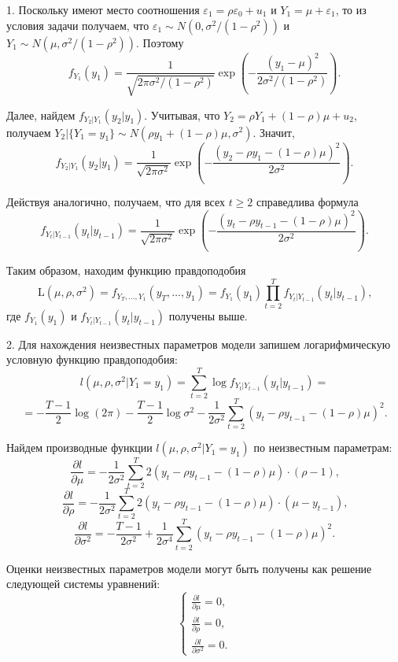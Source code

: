 \documentclass[pdftex,11pt,openany]{book}\usepackage[]{graphicx}\usepackage[]{color}
\begin{document}
\begin{solution}
1. Поскольку имеют место соотношения $\varepsilon_1 = \rho \varepsilon_0 + u_1$ и $Y_1 =\mu + \varepsilon_1$, то из условия задачи получаем, что $\varepsilon_1 \sim N(0,\sigma^2 / (1 - \rho^2))$
и $Y_1 \sim N(\mu,\sigma^2 / (1 - \rho^2))$. Поэтому
\[
f_{Y_1}(y_1) = \frac{1}{\sqrt{2\pi\sigma^2/(1-\rho^2)}}\exp{\left(-\frac{(y_1 - \mu)^2}{2\sigma^2/(1 - \rho^2)}\right)}.
\]

Далее, найдем $f_{Y_2|Y_1}(y_2|y_1)$. Учитывая, что $Y_2 = \rho Y_1 + (1- \rho) \mu + u_2$, получаем $Y_2|\{Y_1 = y_1\} \sim N(\rho y_1 + (1- \rho) \mu, \sigma^2)$. Значит,
\[
f_{Y_2|Y_1}(y_2|y_1) = \frac{1}{\sqrt{2\pi\sigma^2}}\exp{\left(-\frac{(y_2 - \rho y_1 - (1- \rho) \mu)^2}{2\sigma^2}\right)}.
\]

Действуя аналогично, получаем, что для всех $t \geq 2$ справедлива формула
\[
f_{Y_{t}|Y_{t-1}}(y_{t}|y_{t-1}) = \frac{1}{\sqrt{2\pi\sigma^2}}\exp{\left(-\frac{(y_{t} - \rho y_{t-1} - (1- \rho) \mu)^2}{2\sigma^2}\right)}.
\]

Таким образом, находим функцию правдоподобия
\[
\mathrm{L}(\mu, \rho, \sigma^2) = f_{Y_T,\ldots,Y_1}(y_T,\dots,y_1) = f_{Y_1}(y_1)\prod_{t=2}^{T}f_{Y_t|Y_{t-1}}(y_t|y_{t-1}) \text{,}
\]
где $f_{Y_1}(y_1)$ и $f_{Y_t|Y_{t-1}}(y_t|y_{t-1})$ получены выше.

2. Для нахождения неизвестных параметров модели запишем логарифмическую условную функцию правдоподобия:
\[
l(\mu, \rho, \sigma^2|Y_1 = y_1) = \sum_{t=2}^{T}\log{f_{Y_t|Y_{t-1}}(y_t|y_{t-1})} = 
\]
\[
=-\frac{T-1}{2} \log(2 \pi) - \frac{T-1}{2} \log{\sigma^2} - \frac{1}{2\sigma^2} \sum_{t=2}^{T}(y_t - \rho y_{t-1} - (1 - \rho) \mu)^2 \text{.} 
\]

Найдем производные функции $l(\mu, \rho, \sigma^2|Y_1 = y_1)$ по неизвестным параметрам:
\[
\frac{\partial l}{\partial \mu} = -\frac{1}{2\sigma^2} \sum_{t=2}^{T} 2(y_t - \rho y_{t-1} - (1 - \rho) \mu) \cdot (\rho - 1) \text{,}
\]
\[
\frac{\partial l}{\partial \rho} = -\frac{1}{2\sigma^2} \sum_{t=2}^{T} 2(y_t - \rho y_{t-1} - (1 - \rho) \mu) \cdot (\mu - y_{t-1}) \text{,}
\]
\[
\frac{\partial l}{\partial {\sigma^2}} =  - \frac{T-1}{2\sigma^2} + \frac{1}{2\sigma^4} \sum_{t=2}^{T}(y_t - \rho y_{t-1} - (1 - \rho) \mu)^2 \text{.}
\]

Оценки неизвестных параметров модели могут быть получены как решение следующей системы уравнений:
\[
\left\{
  \begin{aligned}
    \frac{\partial l}{\partial \mu} = 0 \text{,} \\
    \frac{\partial l}{\partial \rho} = 0 \text{,} \\
    \frac{\partial l}{\partial {\sigma^2}} = 0 \text{.}
  \end{aligned}
\right.
\]


\end{solution}
\end{document}
